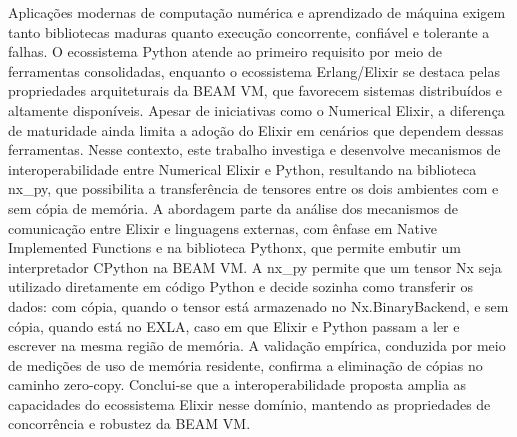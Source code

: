 
\begin{resumoutfpr}%
Aplicações modernas de computação numérica e aprendizado de máquina exigem tanto bibliotecas maduras quanto execução concorrente, confiável e tolerante a falhas. O ecossistema Python atende ao primeiro requisito por meio de ferramentas consolidadas, enquanto o ecossistema Erlang/Elixir se destaca pelas propriedades arquiteturais da BEAM VM, que favorecem sistemas distribuídos e altamente disponíveis. Apesar de iniciativas como o Numerical Elixir, a diferença de maturidade ainda limita a adoção do Elixir em cenários que dependem dessas ferramentas. Nesse contexto, este trabalho investiga e desenvolve mecanismos de interoperabilidade entre Numerical Elixir e Python, resultando na biblioteca nx\_py, que possibilita a transferência de tensores entre os dois ambientes com e sem cópia de memória. A abordagem parte da análise dos mecanismos de comunicação entre Elixir e linguagens externas, com ênfase em Native Implemented Functions e na biblioteca Pythonx, que permite embutir um interpretador CPython na BEAM VM. A nx\_py permite que um tensor Nx seja utilizado diretamente em código Python e decide sozinha como transferir os dados: com cópia, quando o tensor está armazenado no Nx.BinaryBackend, e sem cópia, quando está no EXLA, caso em que Elixir e Python passam a ler e escrever na mesma região de memória. A validação empírica, conduzida por meio de medições de uso de memória residente, confirma a eliminação de cópias no caminho zero-copy. Conclui-se que a interoperabilidade proposta amplia as capacidades do ecossistema Elixir nesse domínio, mantendo as propriedades de concorrência e robustez da BEAM VM.
\end{resumoutfpr}

